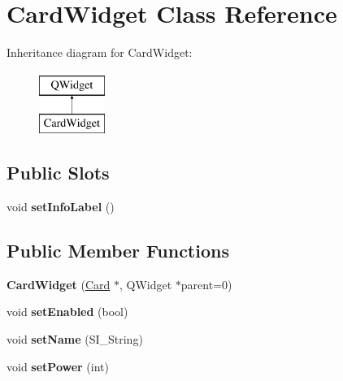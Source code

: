 \hypertarget{class_card_widget}{}\section{Card\+Widget Class Reference}
\label{class_card_widget}
Inheritance diagram for Card\+Widget\+:\begin{figure}[H]
\begin{center}
\leavevmode
\includegraphics[height=2.000000cm]{class_card_widget}
\end{center}
\end{figure}
\subsection*{Public Slots}
\begin{DoxyCompactItemize}
\item 
\mbox{\label{class_card_widget_adbe8215dd0c765e654e25ba140753bfd}} 
void {\bfseries set\+Info\+Label} ()
\end{DoxyCompactItemize}
\subsection*{Public Member Functions}
\begin{DoxyCompactItemize}
\item 
\mbox{\label{class_card_widget_a2c634d21182039e586d62709f6e1d49b}} 
{\bfseries Card\+Widget} (\hyperlink{class_card}{Card} $\ast$, Q\+Widget $\ast$parent=0)
\item 
\mbox{\label{class_card_widget_a768a4290ec339ddccc6e236f72fce14f}} 
void {\bfseries set\+Enabled} (bool)
\item 
\mbox{\label{class_card_widget_ab1b658a6f432c2061029748198ef3e24}} 
void {\bfseries set\+Name} (S\+I\+\_\+\+String)
\item 
\mbox{\label{class_card_widget_aff538dc64ec9268b0e5ffabc17014f03}} 
void {\bfseries set\+Power} (int)
\end{DoxyCompactItemize}
